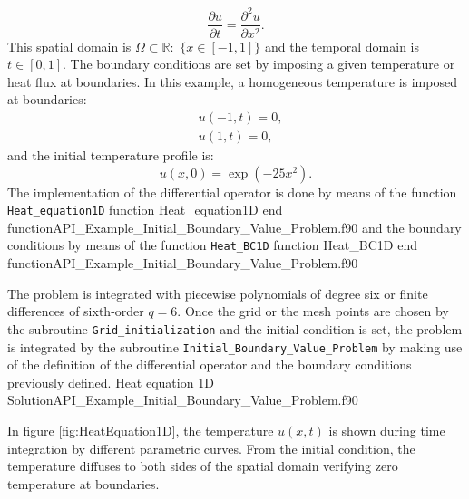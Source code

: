       \begin{equation*}      	
      \frac{\partial u}{\partial t} =  \frac{\partial^2 u}{\partial x^2}.
      \end{equation*}
This spatial domain is $\Omega \subset \mathbb{R} : $ $\{x\in  [-1,1]\}$ and the temporal domain is $t \in [0,1]$.      
The boundary conditions are set by imposing a given temperature or heat flux at boundaries. In this example, a homogeneous temperature is  imposed at boundaries:
      \begin{align*}      	
       & u(-1,t)=0, \\
       & u(1,t)=0,
      \end{align*}
and the initial temperature profile is:
      \begin{equation*}      	
      u(x,0)=\exp(-25 x^2).
      \end{equation*}
The implementation of the differential operator is done by means of the function \verb|Heat_equation1D|
      \vspace{0.2cm} 
      {function Heat_equation1D}
      {end function}{API_Example_Initial_Boundary_Value_Problem.f90}
and  the boundary conditions by means of the function \verb|Heat_BC1D|
      \vspace{0.2cm} 
      {function Heat_BC1D}
      {end function}{API_Example_Initial_Boundary_Value_Problem.f90}
      
The problem is integrated with piecewise polynomials of degree six or finite differences of sixth-order $q=6$.  Once the grid or the mesh points are chosen by the subroutine \verb|Grid_initialization| and the initial condition is set, the problem is integrated by the subroutine
\verb|Initial_Boundary_Value_Problem| by making use of the definition of the differential operator and the boundary conditions previously defined.
      \vspace{0.5cm} 
      {Heat equation 1D}
      {Solution}{API_Example_Initial_Boundary_Value_Problem.f90}

In figure \ref{fig:HeatEquation1D}, the temperature $ u(x,t) $ is shown during time integration by different parametric curves. 
From the initial condition, the temperature diffuses to both sides of the spatial domain verifying zero temperature at boundaries. 

